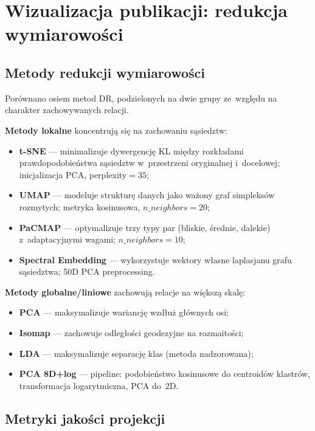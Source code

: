 \documentclass[a4paper,11pt,twocolumn]{article}
\begin{document}
\section{Wizualizacja publikacji: redukcja wymiarowości}
\label{sec:dr}

\subsection{Metody redukcji wymiarowości}

Porównano osiem metod DR, podzielonych na dwie grupy ze~względu na
charakter zachowywanych relacji.

\textbf{Metody lokalne} koncentrują się na zachowaniu sąsiedztw:
\begin{itemize}
  \item \textbf{t-SNE} --- minimalizuje dywergencję KL między rozkładami
        prawdopodobieństwa sąsiedztw w~przestrzeni oryginalnej i~docelowej;
        inicjalizacja PCA, perplexity$=35$;
  \item \textbf{UMAP} --- modeluje strukturę danych jako ważony graf
        simpleksów rozmytych; metryka kosinusowa, $n\_neighbors=20$;
  \item \textbf{PaCMAP} --- optymalizuje trzy typy par (bliskie, średnie,
        dalekie) z~adaptacyjnymi wagami; $n\_neighbors=10$;
  \item \textbf{Spectral Embedding} --- wykorzystuje wektory własne
        laplasjanu grafu sąsiedztwa; 50D PCA preprocessing.
\end{itemize}

\textbf{Metody globalne/liniowe} zachowują relacje na większą skalę:
\begin{itemize}
  \item \textbf{PCA} --- maksymalizuje wariancję wzdłuż głównych osi;
  \item \textbf{Isomap} --- zachowuje odległości geodezyjne na rozmaitości;
  \item \textbf{LDA} --- maksymalizuje separację klas (metoda nadzorowana);
  \item \textbf{PCA 8D+log} --- pipeline: podobieństwo kosinusowe do
        centroidów klastrów, transformacja logarytmiczna, PCA do~2D.
\end{itemize}

\subsection{Metryki jakości projekcji}
\end{document}

